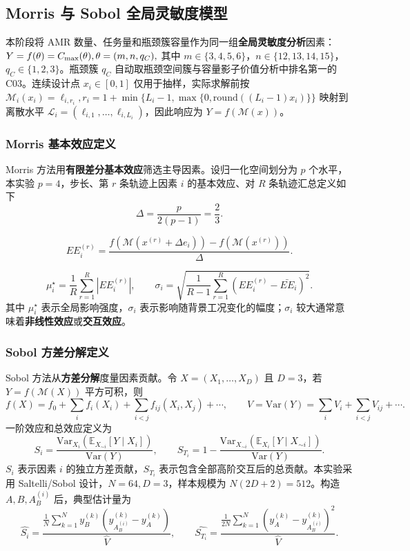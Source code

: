\subsection{Morris 与 Sobol 全局灵敏度模型}

本阶段将 AMR 数量、任务量和瓶颈簇容量作为同一组\textbf{全局灵敏度分析}因素：$Y=f(\theta)=C_{\max}(\theta),\theta=(m,n,q_C),$
其中 $m\in\{3,4,5,6\}$，$n\in\{12,13,14,15\}$，$q_C\in\{1,2,3\}$。瓶颈簇 $q_C$ 自动取瓶颈空间簇与容量影子价值分析中排名第一的 C03。连续设计点 $x_i\in[0,1]$ 仅用于抽样，实际求解前按
$
\mathcal{M}_i(x_i)=\ell_{i,r_i},
r_i=1+\min\{L_i-1,\max\{0,\mathrm{round}((L_i-1)x_i)\}\}
$
映射到离散水平 $\mathcal{L}_i=(\ell_{i,1},\ldots,\ell_{i,L_i})$，因此响应为 $Y=f(\mathcal{M}(x))$。

\subsubsection{Morris 基本效应定义}

Morris 方法用\textbf{有限差分基本效应}筛选主导因素。设归一化空间划分为 $p$ 个水平，本实验 $p=4$，步长、第 $r$ 条轨迹上因素 $i$ 的基本效应、对 $R$ 条轨迹汇总定义如下
\[
\Delta=\frac{p}{2(p-1)}=\frac{2}{3}.
\]

\[
EE_i^{(r)}
=\frac{f(\mathcal{M}(x^{(r)}+\Delta e_i))-f(\mathcal{M}(x^{(r)}))}{\Delta}.
\]

\[
\mu_i^\star=\frac{1}{R}\sum_{r=1}^{R}|EE_i^{(r)}|,\qquad
\sigma_i=\sqrt{\frac{1}{R-1}\sum_{r=1}^{R}\left(EE_i^{(r)}-\bar{EE}_i\right)^2}.
\]
其中 $\mu_i^\star$ 表示全局影响强度，$\sigma_i$ 表示影响随背景工况变化的幅度；$\sigma_i$ 较大通常意味着\textbf{非线性效应}或\textbf{交互效应}。

\subsubsection{Sobol 方差分解定义}

Sobol 方法从\textbf{方差分解}度量因素贡献。令 $X=(X_1,\ldots,X_D)$ 且 $D=3$，若 $Y=f(\mathcal{M}(X))$ 平方可积，则
\[
f(X)=f_0+\sum_i f_i(X_i)+\sum_{i<j}f_{ij}(X_i,X_j)+\cdots,\qquad
V=\mathrm{Var}(Y)=\sum_iV_i+\sum_{i<j}V_{ij}+\cdots.
\]
一阶效应和总效应定义为
\[
S_i=\frac{\mathrm{Var}_{X_i}\left(\mathbb{E}_{X_{\sim i}}[Y\mid X_i]\right)}{\mathrm{Var}(Y)},\qquad
S_{T_i}=1-\frac{\mathrm{Var}_{X_{\sim i}}\left(\mathbb{E}_{X_i}[Y\mid X_{\sim i}]\right)}{\mathrm{Var}(Y)}.
\]
$S_i$ 表示因素 $i$ 的独立方差贡献，$S_{T_i}$ 表示包含全部高阶交互后的总贡献。本实验采用 Saltelli/Sobol 设计，$N=64,D=3$，样本规模为 $N(2D+2)=512$。构造 $A,B,A_B^{(i)}$ 后，典型估计量为
\[
\widehat{S_i}=
\frac{\frac{1}{N}\sum_{k=1}^Ny_B^{(k)}(y_{A_B^{(i)}}^{(k)}-y_A^{(k)})}{\widehat V},\qquad
\widehat{S_{T_i}}=
\frac{\frac{1}{2N}\sum_{k=1}^N(y_A^{(k)}-y_{A_B^{(i)}}^{(k)})^2}{\widehat V}.
\]
